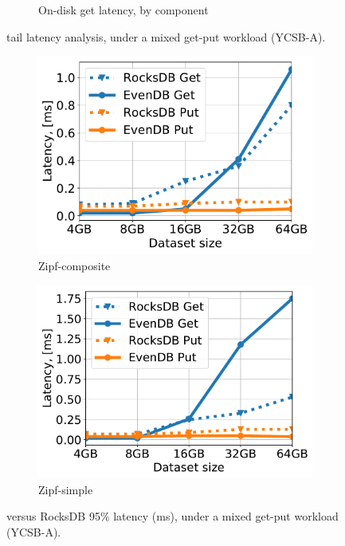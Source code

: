 {\begin{figure}[tb]
\begin{subfigure}{0.31\linewidth}
\caption{On-disk get latency, by component}
\label{fig:tail_latency:disk}
\end{subfigure}
\label{fig:tail_latency}
\caption{{\sys\/ tail latency analysis, under a mixed get-put workload (YCSB-A).}}
\end{figure}
}

\begin{figure}[htb]
\centering
\begin{subfigure}{0.49\linewidth}
\includegraphics[width=\textwidth]{figs/tail_flurry_line.pdf}
\caption{Zipf-composite}
\label{fig:tail_latency:co}
\end{subfigure}
\begin{subfigure}{0.49\linewidth}
\includegraphics[width=\textwidth]{figs/tail_zipf_line.pdf}
\caption{Zipf-simple}
\label{fig:tail_latency:si}
\end{subfigure}
\caption{{\sys\/ versus RocksDB 95\% latency (ms), under a mixed get-put workload (YCSB-A).}}
\label{fig:tail_latency}
\end{figure}

